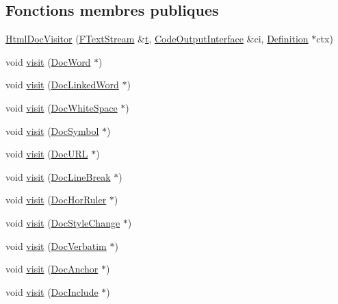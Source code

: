 \subsection*{Fonctions membres publiques}
\begin{DoxyCompactItemize}
\item 
\hyperlink{class_html_doc_visitor_a8c03fee9956cb45845de0516e34a5cb6}{Html\+Doc\+Visitor} (\hyperlink{class_f_text_stream}{F\+Text\+Stream} \&\hyperlink{058__bracket__recursion_8tcl_a69e959f6901827e4d8271aeaa5fba0fc}{t}, \hyperlink{class_code_output_interface}{Code\+Output\+Interface} \&ci, \hyperlink{class_definition}{Definition} $\ast$ctx)
\item 
void \hyperlink{class_html_doc_visitor_abca9a53f6bed1fe8b60ce4cd05ac84ed}{visit} (\hyperlink{class_doc_word}{Doc\+Word} $\ast$)
\item 
void \hyperlink{class_html_doc_visitor_a008d1f60fc1f8b939453e6fff48167cf}{visit} (\hyperlink{class_doc_linked_word}{Doc\+Linked\+Word} $\ast$)
\item 
void \hyperlink{class_html_doc_visitor_ae6005caa36b3ca91535eaab87ad00b7f}{visit} (\hyperlink{class_doc_white_space}{Doc\+White\+Space} $\ast$)
\item 
void \hyperlink{class_html_doc_visitor_a6b8d144af0cd61d46c154b6b962b650e}{visit} (\hyperlink{class_doc_symbol}{Doc\+Symbol} $\ast$)
\item 
void \hyperlink{class_html_doc_visitor_aacac6318b77d0ebfd43571ba7251e010}{visit} (\hyperlink{class_doc_u_r_l}{Doc\+U\+R\+L} $\ast$)
\item 
void \hyperlink{class_html_doc_visitor_aa012479a75447e85dacd53dd7f4fc649}{visit} (\hyperlink{class_doc_line_break}{Doc\+Line\+Break} $\ast$)
\item 
void \hyperlink{class_html_doc_visitor_a83fcee202b30f3f8c5cf3992cab36dac}{visit} (\hyperlink{class_doc_hor_ruler}{Doc\+Hor\+Ruler} $\ast$)
\item 
void \hyperlink{class_html_doc_visitor_a05c87c4bd5bf1752107390714cf00836}{visit} (\hyperlink{class_doc_style_change}{Doc\+Style\+Change} $\ast$)
\item 
void \hyperlink{class_html_doc_visitor_a550726b1eee6deb0a86b94ed5a4355f0}{visit} (\hyperlink{class_doc_verbatim}{Doc\+Verbatim} $\ast$)
\item 
void \hyperlink{class_html_doc_visitor_a74f9d2eebe78d4a853d5d5226b75bd53}{visit} (\hyperlink{class_doc_anchor}{Doc\+Anchor} $\ast$)
\item 
void \hyperlink{class_html_doc_visitor_a7c92524f469e3783cd6b768af04f2f5a}{visit} (\hyperlink{class_doc_include}{Doc\+Include} $\ast$)

\end{DoxyCompactItemize}
